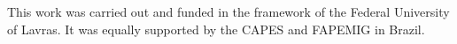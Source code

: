 This work was carried out and funded in the framework of the Federal University of Lavras. It was equally supported by
the CAPES and FAPEMIG in Brazil.
